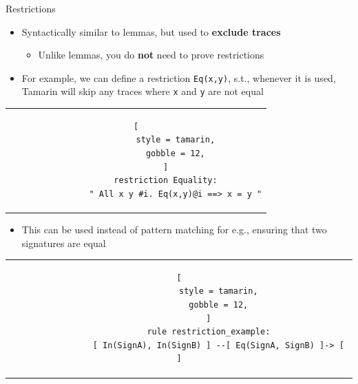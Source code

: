 \documentclass[11pt,aspectratio=169]{beamer}
\begin{document}
\begin{frame}[fragile]{Restrictions}
    \begin{itemize}
        \item Syntactically similar to lemmas, but used to
              \textbf{exclude traces}
        \begin{itemize}
            \item Unlike lemmas, you do \textbf{not} need to prove restrictions
        \end{itemize}
        \item For example, we can define a restriction \texttt{Eq(x,y)}, s.t., 
              whenever it is used, Tamarin will skip any traces where
              \texttt{x} and \texttt{y} are not equal
    \end{itemize}
    \begin{center}
        \begin{tabular}{c}
            \begin{lstlisting}[
                style = tamarin,
                gobble = 12,
            ]
            restriction Equality:
                " All x y #i. Eq(x,y)@i ==> x = y "
            \end{lstlisting}\\
        \end{tabular}
    \end{center}
    \begin{itemize}
        \item This can be used instead of pattern matching for e.g., ensuring 
              that two signatures are equal
    \end{itemize}
    \begin{center}
        \begin{tabular}{c}
            \begin{lstlisting}[
                style = tamarin,
                gobble = 12,
            ]
            rule restriction_example:
                [ In(SignA), In(SignB) ] --[ Eq(SignA, SignB) ]-> [ ]
            \end{lstlisting}\\
        \end{tabular}
    \end{center}
\end{frame}
\end{document}
